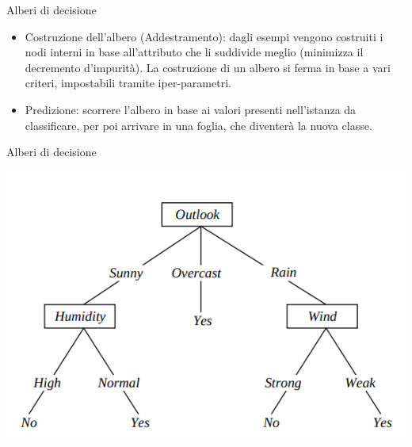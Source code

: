 \documentclass[11pt]{beamer}
\begin{document}
	\begin{frame}{Alberi di decisione}
		\begin{itemize}
			\item Costruzione dell'albero (Addestramento): dagli esempi vengono costruiti i nodi interni in base all'attributo che li suddivide meglio (minimizza il decremento d'impurit\`a). La costruzione di un albero si ferma in base a vari criteri, impostabili tramite iper-parametri. 
			\item Predizione: scorrere l'albero in base ai valori presenti nell'istanza da classificare, per poi arrivare in una foglia, che diventer\`a la nuova classe.
		\end{itemize}
	\end{frame}
	\begin{frame}{Alberi di decisione}
		\begin{center}
			\includegraphics[width=0.7\linewidth]{img/decision_tree_tree_tennis}
		\end{center}
	\end{frame}
\end{document}
